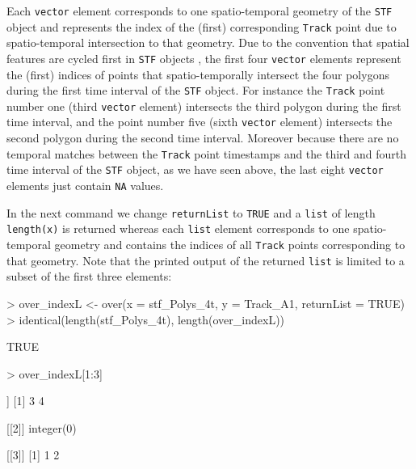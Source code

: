 \documentclass[12pt, oneside, a4paper]{scrbook}
\let\code=\texttt
\begin{document}
Each \code{vector} element corresponds to one spatio-temporal geometry of the \code{STF} object and represents the index of the (first) corresponding \code{Track} point due to spatio-temporal intersection to that geometry. Due to the convention that spatial features are cycled first in \code{STF} objects \citep{pebesma_spacetime:_2012}, the first four \code{vector} elements represent the (first) indices of points that spatio-temporally intersect the four polygons during the first time interval of the \code{STF} object.
For instance the \code{Track} point number one (third \code{vector} element) intersects the third polygon during the first time interval, and the point number five (sixth \code{vector} element) intersects the second polygon during the second time interval. Moreover because there are no temporal matches between the \code{Track} point timestamps and the third and fourth time interval of the \code{STF} object, as we have seen above, the last eight \code{vector} elements just contain \code{NA} values.
\par\medskip
In the next command we change \code{returnList} to \code{TRUE} and a \code{list} of length \code{length(x)} is returned whereas each \code{list} element corresponds to one spatio-temporal geometry and contains the indices of all \code{Track} points corresponding to that geometry. 
Note that the printed output of the returned \code{list} is limited to a subset of the first three elements:

\begin{small}
\begin{Schunk}
\begin{Sinput}
> over_indexL <- over(x = stf_Polys_4t, y = Track_A1, returnList = TRUE)
> identical(length(stf_Polys_4t), length(over_indexL))
\end{Sinput}
\begin{Soutput}
[1] TRUE
\end{Soutput}
\begin{Sinput}
> over_indexL[1:3]
\end{Sinput}
\begin{Soutput}
[[1]]
[1] 3 4

[[2]]
integer(0)

[[3]]
[1] 1 2
\end{Soutput}
\end{Schunk}
\end{small}
\end{document}

